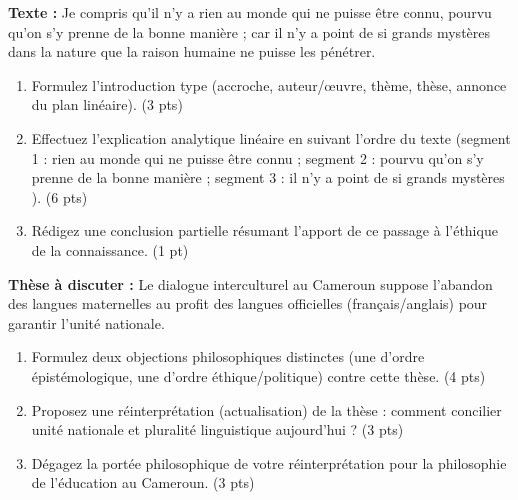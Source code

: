 \documentclass[11pt]{article}
\begin{document}
\begin{exercice}
\textbf{Texte :} \og Je compris qu'il n'y a rien au monde qui ne puisse être connu, pourvu qu'on s'y prenne de la bonne manière ; car il n'y a point de si grands mystères dans la nature que la raison humaine ne puisse les pénétrer. \fg{}
\begin{enumerate}
    \item Formulez l'introduction type (accroche, auteur/œuvre, thème, thèse, annonce du plan linéaire). (3 pts)
    \item Effectuez l'explication analytique linéaire en suivant l'ordre du texte (segment 1 : \og rien au monde qui ne puisse être connu \fg{} ; segment 2 : \og pourvu qu'on s'y prenne de la bonne manière \fg{} ; segment 3 : \og il n'y a point de si grands mystères \fg{}). (6 pts)
    \item Rédigez une conclusion partielle résumant l'apport de ce passage à l'éthique de la connaissance. (1 pt)
\end{enumerate}
\end{exercice}

\begin{exercice}
\textbf{Thèse à discuter :} \og Le dialogue interculturel au Cameroun suppose l'abandon des langues maternelles au profit des langues officielles (français/anglais) pour garantir l'unité nationale. \fg{}
\begin{enumerate}
    \item Formulez deux objections philosophiques distinctes (une d'ordre épistémologique, une d'ordre éthique/politique) contre cette thèse. (4 pts)
    \item Proposez une réinterprétation (actualisation) de la thèse : comment concilier unité nationale et pluralité linguistique aujourd'hui ? (3 pts)
    \item Dégagez la portée philosophique de votre réinterprétation pour la philosophie de l'éducation au Cameroun. (3 pts)
\end{enumerate}
\end{exercice}
\end{document}
